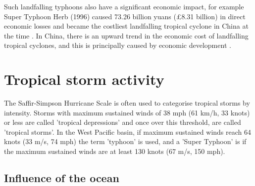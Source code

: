 Such landfalling typhoons also have a significant economic impact, for example Super Typhoon Herb (1996) caused 73.26 billion yuans  (£8.31 billion) in direct economic losses and became the costliest landfalling tropical cyclone in China at the time \citep{zhang2009tropical}. In China, there is an upward trend in the economic cost of landfalling tropical cyclones, and this is principally caused by economic development \citep{zhang2009tropical}.





\section{Tropical storm activity}

The Saffir-Simpson Hurricane Scale \citep{simpson1974hurricane} is often used to categorise tropical storms by intensity. Storms with maximum sustained winds of 38 mph (61 km/h, 33 knots) or less are called 'tropical depressions' and once over this threshold, are called 'tropical storms'. In the West Pacific basin, if maximum sustained winds reach 64 knots (33 m/s, 74 mph) the term 'typhoon' is used, and a 'Super Typhoon' is if the maximum sustained winds are at least 130 knots (67 m/s, 150 mph). %

\subsection{Influence of the ocean} \label{ocean}

